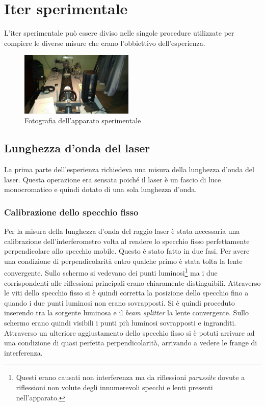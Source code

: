 \documentclass[a4paper,11pt]{article}
\begin{document}
	\section{Iter sperimentale}
	L'iter sperimentale può essere diviso nelle singole procedure utilizzate per compiere le diverse misure che erano l'obbiettivo dell'esperienza.
	
	\begin{figure}
		\vspace{-2.2cm}
		\caption{Fotografia dell'apparato sperimentale}
		\vspace{0.2cm}
		\centering
		\label{apparato}
		\includegraphics[width=0.48\textwidth]{apparato}
		\vspace{-1cm}
	\end{figure}
	
	\subsection{Lunghezza d'onda del laser}
	La prima parte dell'esperienza richiedeva una misura della lunghezza d'onda del laser. Questa operazione era sensata poiché il laser è un fascio di luce monocromatico e quindi dotato di una sola lunghezza d'onda.
	
	\subsubsection{Calibrazione dello specchio fisso}\label{calib}
	Per la misura della lunghezza d'onda del raggio laser è stata necessaria una calibrazione dell'interferometro volta al rendere lo specchio fisso perfettamente perpendicolare allo specchio mobile. Questo è stato fatto in due fasi. Per avere una condizione di perpendicolarità entro qualche primo è stata tolta la lente convergente. Sullo schermo si vedevano dei punti luminosi\footnote{Questi erano causati non interferenza ma da riflessioni \emph{parassite} dovute a riflessioni non volute degli innumerevoli specchi e lenti presenti nell'apparato.} ma i due corrispondenti alle riflessioni principali erano chiaramente distinguibili. Attraverso le viti dello specchio fisso si è quindi corretta la posizione dello specchio fino a quando i due punti luminosi non erano sovrapposti. Si è quindi proceduto inserendo tra la sorgente luminosa e il \emph{beam splitter}  la lente convergente. Sullo schermo erano quindi visibili i punti più luminosi sovrapposti e ingranditi. Attraverso un ulteriore aggiustamento dello specchio fisso si è potuti arrivare ad una condizione di quasi perfetta perpendicolarità, arrivando a vedere le frange di interferenza.
	
\end{document}
